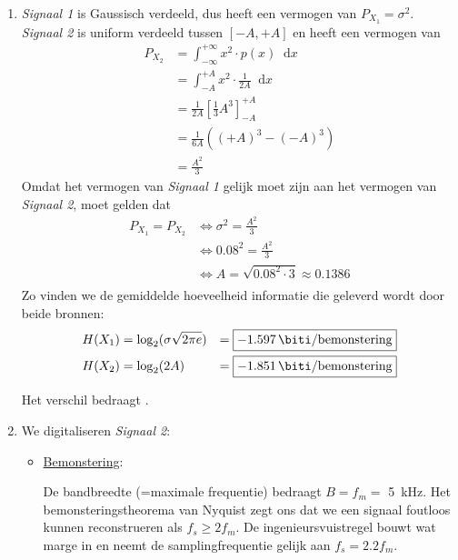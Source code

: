 \documentclass{kuburgiearticle}
\newcommand*\diff{\mathop{}\!\mathrm{d}}
\begin{document}
	\begin{enumerate}
		\item \textit{Signaal 1} is Gaussisch verdeeld, dus heeft een vermogen van \( P_{{X_1}} = \sigma^2 \).
		\textit{Signaal 2} is uniform verdeeld tussen \( [-A,+A] \) en heeft een vermogen van
		\begin{equation*}
			\begin{split}
				P_{{X_2}} & = \int_{-\infty}^{+\infty}x^2\cdot p(x) \diff{x} \\
				       & = \int_{-A}^{+A}x^2\cdot \frac{1}{2A} \diff{x} \\
				       & = \frac{1}{2A} \left[\frac{1}{3}A^3\right]^{+A}_{-A} \\
				       & = \frac{1}{6A} \left((+A)^3-(-A)^3\right) \\
				       & = \frac{A^2}{3}
			\end{split}
		\end{equation*}
		Omdat het vermogen van \textit{Signaal 1} gelijk moet zijn aan het vermogen van \textit{Signaal 2}, moet gelden dat
		\begin{equation*}
			\begin{split}
				P_{{X_1}} = P_{{X_2}} & \Leftrightarrow \sigma^2 = \frac{A^2}{3} \\
				& \Leftrightarrow 0.08^2 = \frac{A^2}{3} \\
				& \Leftrightarrow A = \sqrt{0.08^2\cdot 3} \approx 0.1386 \\
			\end{split}
		\end{equation*}
		Zo vinden we de gemiddelde hoeveelheid informatie die geleverd wordt door beide bronnen:
		\begin{align*}
			&H(X_1) = \log_2({\sigma\sqrt{2\pi e}}) &= \boxed{\SI{-1.597}{\biti \per bemonstering}} \\
			&H(X_2) = \log_2({2A}) &= \boxed{\SI{-1.851}{\biti \per bemonstering}}
		\end{align*}

		Het verschil bedraagt .

		\newpage

		\item We digitaliseren \textit{Signaal 2}:
		\begin{itemize}
			\item \underline{Bemonstering}:

			De bandbreedte (=maximale frequentie) bedraagt \( B =f_m= \) \SI{5}{\kilo\hertz}. Het bemonsteringstheorema van Nyquist zegt ons dat we een signaal foutloos kunnen reconstrueren als \( f_s \geq 2f_m \). De ingenieursvuistregel bouwt wat marge in en neemt de samplingfrequentie gelijk aan \( f_s=2.2f_m \).


\end{itemize}
\end{enumerate}
\end{document}
